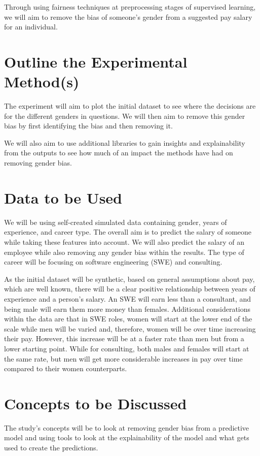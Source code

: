 \documentclass{sigchi}
\begin{document}
Through using fairness techniques at preprocessing stages \cite{} of supervised learning, we will aim to remove the bias of someone's gender from a suggested pay salary for an individual. %


\section{Outline the Experimental Method(s)}
The experiment will aim to plot the initial dataset to see where the decisions are for the different genders in questions. We will then aim to remove this gender bias by first identifying the bias and then removing it. 

We will also aim to use additional libraries to gain insights and explainability from the outputs to see how much of an impact the methods have had on removing gender bias.

\section{Data to be Used}
We will be using self-created simulated data containing gender, years of experience, and career type. The overall aim is to predict the salary of someone while taking these features into account. We will also predict the salary of an employee while also removing any gender bias within the results. The type of career will be focusing on software engineering (SWE) and consulting.

As the initial dataset will be synthetic, based on general assumptions about pay, which are well known, there will be a clear positive relationship between years of experience and a person's salary. An SWE will earn less than a consultant, and being male will earn them more money than females. Additional considerations within the data are that in SWE roles, women will start at the lower end of the scale while men will be varied and, therefore, women will be over time increasing their pay. However, this increase will be at a faster rate than men but from a lower starting point. While for consulting, both males and females will start at the same rate, but men will get more considerable increases in pay over time compared to their women counterparts.

\section{Concepts to be Discussed}

The study's concepts will be to look at removing gender bias from a predictive model and using tools to look at the explainability of the model and what gets used to create the predictions.
\end{document}
